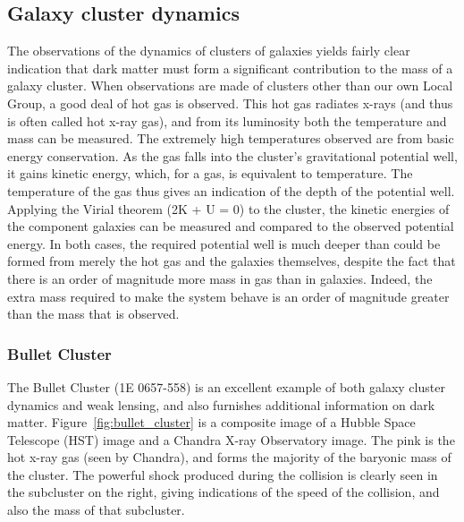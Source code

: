 \subsection{Galaxy cluster dynamics}

The observations of the dynamics of clusters of galaxies yields fairly clear indication that dark matter must form a significant contribution to the mass of a galaxy cluster. When observations are made of clusters other than our own Local Group, a good deal of hot gas is observed. This hot gas radiates x-rays (and thus is often called hot x-ray gas), and from its luminosity both the temperature and mass can be measured. The extremely high temperatures observed are from basic energy conservation. As the gas falls into the cluster's gravitational potential well, it gains kinetic energy, which, for a gas, is equivalent to temperature. The temperature of the gas thus gives an indication of the depth of the potential well. Applying the Virial theorem (2K + U = 0) to the cluster, the kinetic energies of the component galaxies can be measured and compared to the observed potential energy. In both cases, the required potential well is much deeper than could be formed from merely the hot gas and the galaxies themselves, despite the fact that there is an order of magnitude more mass in gas than in galaxies. Indeed, the extra mass required to make the system behave is an order of magnitude greater than the mass that is observed.

\subsubsection{Bullet Cluster}

The Bullet Cluster (1E 0657-558) is an excellent example of both galaxy cluster dynamics and weak lensing, and also furnishes additional information on dark matter. Figure~\ref{fig:bullet_cluster} is a composite image of a Hubble Space Telescope (HST) image and a Chandra X-ray Observatory image. The pink is the hot x-ray gas (seen by Chandra), and forms the majority of the baryonic mass of the cluster. The powerful shock produced during the collision is clearly seen in the subcluster on the right, giving indications of the speed of the collision, and also the mass of that subcluster.


